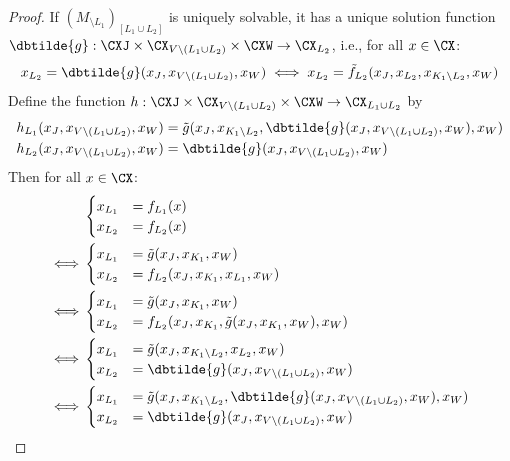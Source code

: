 \begin{proof}
  If $(M_{\setminus L_1})_{[L_1\cup L_2]}$ is uniquely solvable, it has a unique solution function
  $\dbtilde{g} : \CXJ \times \CX_{V\setminus (L_1\cup L_2)} \times \CXW \to \CX_{L_2}$, i.e., for all $x \in \CX$:
  $$x_{L_2} = \dbtilde{g}(x_J,x_{V\setminus(L_1\cup L_2)},x_W) \iff x_{L_2} = \tilde{f}_{L_2}(x_J,x_{L_2},x_{K_1\setminus L_2},x_W)$$
  Define the function $h : \CXJ \times \CX_{V\setminus(L_1\cup L_2)} \times \CXW \to \CX_{L_1 \cup L_2}$ by
  \begin{align*}
    h_{L_1}(x_J,x_{V\setminus(L_1\cup L_2)},x_W) &= \tilde{g}(x_J,x_{K_1\setminus L_2},\dbtilde{g}(x_J,x_{V\setminus(L_1 \cup L_2)},x_W),x_W) \\
    h_{L_2}(x_J,x_{V\setminus(L_1\cup L_2)},x_W) &= \dbtilde{g}(x_J,x_{V\setminus(L_1 \cup L_2)},x_W)
  \end{align*}
  Then for all $x \in \CX$:
  \begin{equation*}\begin{split}
    & \begin{cases}
      x_{L_1} &= f_{L_1}(x) \\
      x_{L_2} &= f_{L_2}(x) 
    \end{cases} \\
    \iff &
    \begin{cases}
      x_{L_1} &= \tilde{g}(x_J,x_{K_1},x_W) \\
      x_{L_2} &= f_{L_2}(x_J,x_{K_1},x_{L_1},x_W) 
    \end{cases} \\
    \iff &
    \begin{cases}
      x_{L_1} &= \tilde{g}(x_J,x_{K_1},x_W) \\
      x_{L_2} &= f_{L_2}(x_J,x_{K_1},\tilde{g}(x_J,x_{K_1},x_W),x_W) 
    \end{cases} \\
    \iff &
    \begin{cases}
      x_{L_1} &= \tilde{g}(x_J,x_{K_1\setminus L_2},x_{L_2},x_W) \\
      x_{L_2} &= \dbtilde{g}(x_J,x_{V\setminus(L_1 \cup L_2)},x_W)
    \end{cases} \\
    \iff &
    \begin{cases}
      x_{L_1} &= \tilde{g}(x_J,x_{K_1\setminus L_2},\dbtilde{g}(x_J,x_{V\setminus(L_1 \cup L_2)},x_W),x_W) \\
      x_{L_2} &= \dbtilde{g}(x_J,x_{V\setminus(L_1 \cup L_2)},x_W)

\end{cases}
\end{split}
\end{equation*}
\end{proof}
